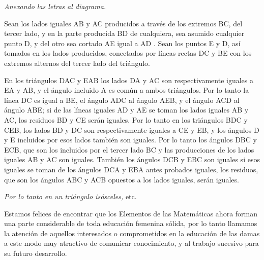 \documentclass[booklanguage=english]{byrnebook}
\begin{document}
\qedNB

\begin{center}
\emph{Anexando las letras al diagrama.}
\end{center}

Sean los lados iguales AB y AC producidos a través de los extremos BC, del tercer lado, y en la parte producida BD de cualquiera, sea asumido cualquier punto D, y del otro sea cortado AE igual a AD . Sean los puntos E y D, así tomados en los lados producidos, conectados por líneas rectas DC y BE con los extremos alternos del tercer lado del triángulo.

En los triángulos DAC y EAB los lados DA y AC son respectivamente iguales a EA y AB, y el ángulo incluido A es común a ambos triángulos. Por lo tanto  la línea DC es igual a BE, el ángulo ADC al ángulo AEB, y el ángulo ACD al ángulo ABE; si de las líneas iguales AD y AE se toman los lados iguales AB y AC, los residuos BD y CE serán iguales. Por lo tanto en los triángulos BDC y CEB, los lados BD y DC son respectivamente iguales a CE y EB, y los ángulos D y E incluidos por esos lados también son iguales. Por lo tanto  los ángulos DBC y ECB, que son los incluidos por el tercer lado BC y las producciones de los lados iguales AB y AC son iguales. También los ángulos DCB y EBC son iguales si esos iguales se toman de los ángulos DCA y EBA antes probados iguales, los residuos, que son los ángulos ABC y ACB opuestos a los lados iguales, serán iguales.

\emph{Por lo tanto en un triángulo isósceles,} etc.

\qedNB


Estamos felices de encontrar que los Elementos de las Matemáticas ahora forman una parte considerable de toda educación femenina sólida, por lo tanto llamamos la atención de aquellos interesados o comprometidos en la educación de las damas a este modo muy atractivo de comunicar conocimiento, y al trabajo sucesivo para su futuro desarrollo.

\end{document}
